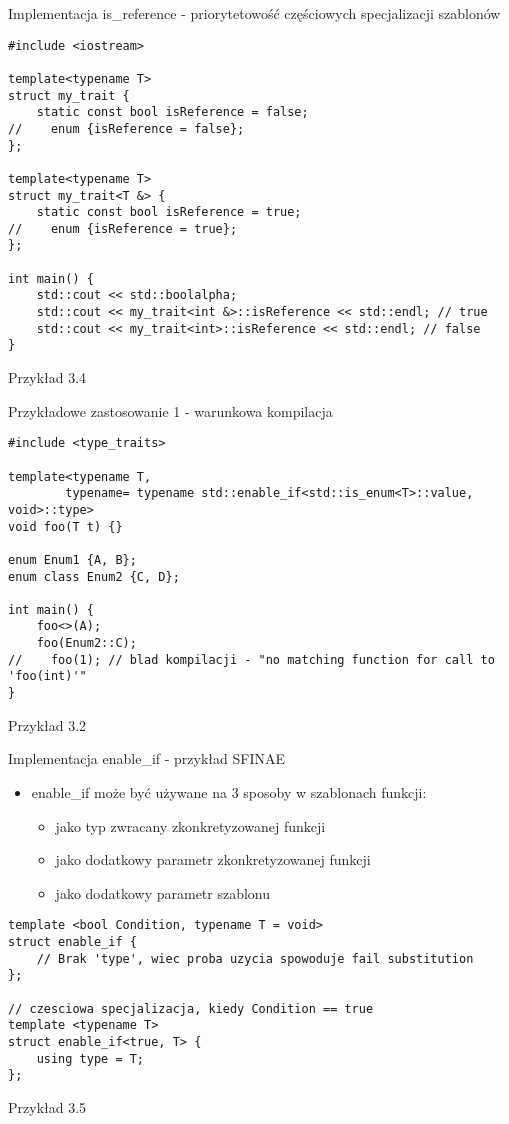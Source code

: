 \documentclass[11pt]{beamer}
\begin{document}
\begin{frame}[fragile]{Implementacja is\_reference - priorytetowość częściowych specjalizacji szablonów}
 \begin{lstlisting}[frame=single,basicstyle=\tiny]
#include <iostream>

template<typename T>
struct my_trait {
    static const bool isReference = false;
//    enum {isReference = false};
};

template<typename T>
struct my_trait<T &> {
    static const bool isReference = true;
//    enum {isReference = true};
};

int main() {
    std::cout << std::boolalpha;
    std::cout << my_trait<int &>::isReference << std::endl; // true
    std::cout << my_trait<int>::isReference << std::endl; // false
}
 \end{lstlisting}
\alert{Przykład 3.4}
\end{frame}

\begin{frame}[fragile]{Przykładowe zastosowanie 1 - warunkowa kompilacja}
 \begin{lstlisting}[frame=single,basicstyle=\tiny]
#include <type_traits>

template<typename T,
        typename= typename std::enable_if<std::is_enum<T>::value, void>::type>
void foo(T t) {}

enum Enum1 {A, B};
enum class Enum2 {C, D};

int main() {
    foo<>(A);
    foo(Enum2::C);
//    foo(1); // blad kompilacji - "no matching function for call to 'foo(int)'"
}
    \end{lstlisting}
    
    \alert{Przykład 3.2}
\end{frame}

\begin{frame}[fragile]{Implementacja enable\_if - przykład SFINAE}
    \begin{itemize}
        \item enable\_if może być używane na 3 sposoby w szablonach funkcji:
        \begin{itemize}
            \item jako typ zwracany zkonkretyzowanej funkcji
            \item jako dodatkowy parametr zkonkretyzowanej funkcji
            \item jako dodatkowy parametr szablonu
        \end{itemize} 
    \end{itemize}


    \begin{lstlisting}[frame=single,basicstyle=\tiny]
template <bool Condition, typename T = void>
struct enable_if {
    // Brak 'type', wiec proba uzycia spowoduje fail substitution
};

// czesciowa specjalizacja, kiedy Condition == true
template <typename T>
struct enable_if<true, T> {
    using type = T;
};
    \end{lstlisting}

    \alert{Przykład 3.5}
\end{frame}
\end{document}
